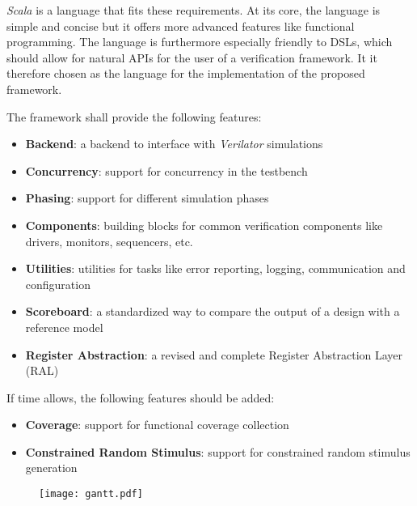 \documentclass[11pt]{article}
\begin{document}
\textit{Scala} is a language that fits these requirements. At its core, the language is simple and concise but it offers more advanced features like functional programming. The language is furthermore especially friendly to DSLs, which should allow for natural APIs for the user of a verification framework. It it therefore chosen as the language for the implementation of the proposed framework.


\noindent The framework shall provide the following features:

\begin{itemize}
    \item \textbf{Backend}: a backend to interface with \textit{Verilator} simulations
    \item \textbf{Concurrency}: support for concurrency in the testbench
    \item \textbf{Phasing}: support for different simulation phases
    \item \textbf{Components}: building blocks for common verification components like drivers, monitors, sequencers, etc.
    \item \textbf{Utilities}: utilities for tasks like error reporting, logging, communication and configuration
    \item \textbf{Scoreboard}: a standardized way to compare the output of a design with a reference model
    \item \textbf{Register Abstraction}: a revised and complete Register Abstraction Layer (RAL)
\end{itemize}

\noindent If time allows, the following features should be added:

\begin{itemize}
    \item \textbf{Coverage}: support for functional coverage collection
    \item \textbf{Constrained Random Stimulus}: support for constrained random stimulus generation
\end{itemize}

\begin{landscape}
    \pagestyle{empty}%
    \begin{figure}
        \hspace{-2.5cm}
        \texttt{[image: gantt.pdf]}
\end{figure}
\end{landscape}


\printbibliography
\end{document}
